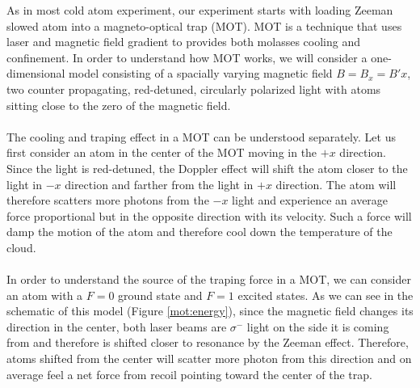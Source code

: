 As in most cold atom experiment, our experiment starts with loading Zeeman slowed atom into a magneto-optical trap (MOT). MOT is a technique that uses laser and magnetic field gradient to provides both molasses cooling and confinement. In order to understand how MOT works, we will consider a one-dimensional model consisting of a spacially varying magnetic field $B=B_x=B'x$, two counter propagating, red-detuned, circularly polarized light with atoms sitting close to the zero of the magnetic field.\\
\\
The cooling and traping effect in a MOT can be understood separately. Let us first consider an atom in the center of the MOT moving in the $+x$ direction. Since the light is red-detuned, the Doppler effect will shift the atom closer to the light in $-x$ direction and farther from the light in $+x$ direction. The atom will therefore scatters more photons from the $-x$ light and experience an average force proportional but in the opposite direction with its velocity. Such a force will damp the motion of the atom and therefore cool down the temperature of the cloud.\\
\\
In order to understand the source of the traping force in a MOT, we can consider an atom with a $F=0$ ground state and $F=1$ excited states. As we can see in the schematic of this model (Figure \ref{mot:energy}), since the magnetic field changes its direction in the center, both laser beams are $\sigma^-$ light on the side it is coming from and therefore is shifted closer to resonance by the Zeeman effect. Therefore, atoms shifted from the center will scatter more photon from this direction and on average feel a net force from recoil pointing toward the center of the trap.\\

